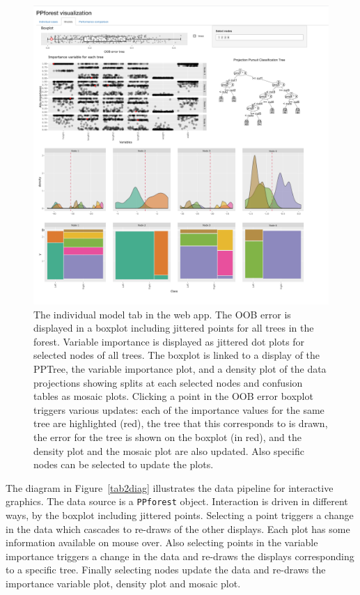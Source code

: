 \documentclass[smallextended,natbib]{svjour3}\usepackage[]{graphicx}\usepackage[]{xcolor}
\begin{document}
\begin{figure}[hbpt]
\centering
\includegraphics[width=1\linewidth]{tab2comp.png}
\caption{The individual model tab in the web app. The OOB error is displayed in a boxplot  including jittered points for all trees in the forest. Variable importance is displayed as jittered dot plots for selected nodes of all trees. The boxplot is linked to a display of the PPTree, the variable importance plot, and a density plot of the data projections showing splits at each selected nodes and confusion tables as mosaic plots. Clicking a point in the OOB error boxplot triggers various updates: each of the importance values for the same tree are highlighted (red), the tree that this corresponds to is drawn, the error for the tree is shown on the boxplot (in red), and the density plot and the mosaic plot are also updated. Also specific nodes can be selected to update the plots.  \label{tab2}}
\end{figure}


The diagram in Figure~\ref{tab2diag} illustrates the data pipeline for interactive graphics.
The data source is a \verb#PPforest# object. Interaction is driven in different ways, by the boxplot including jittered points. Selecting a point triggers a change in the data which cascades to re-draws of the other displays. Each plot has some information available on mouse over. Also selecting points in the variable importance triggers a change in the data and re-draws the displays corresponding to a specific tree. Finally selecting nodes update the data and re-draws the importance variable plot, density plot and mosaic plot.
\end{document}
